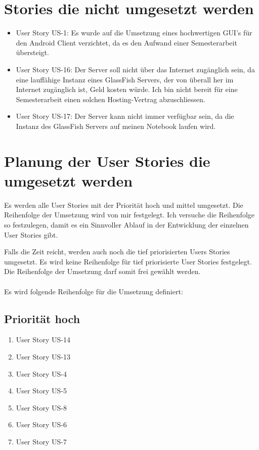 \documentclass[abstracton, listof=totocnumbered,
bibliography=totocnumbered]{scrreprt}
\begin{document}
  \clearpage
  
  \section{Stories die nicht umgesetzt werden}
  
  \begin{itemize}
    \item User Story US-1: Es wurde auf die Umsetzung eines hochwertigen
    \ac{GUI}'s für den Android Client verzichtet, da es den Aufwand einer
    Semesterarbeit übersteigt.
    \item User Story US-16: Der Server soll nicht über das Internet zugänglich
    sein, da eine lauffähige Instanz eines GlassFish Servers, der von überall
    her im Internet zugänglich ist, Geld kosten würde. Ich bin nicht bereit für
    eine Semesterarbeit einen solchen Hosting-Vertrag abzuschliessen.
    \item User Story US-17: Der Server kann nicht immer verfügbar sein, da die
    Instanz des GlassFish Servers auf meinen Notebook laufen wird.
  \end{itemize}
  
  \section{Planung der User Stories die umgesetzt werden}
  
  Es werden alle User Stories mit der Priorität hoch und mittel umgesetzt. Die
  Reihenfolge der Umsetzung wird von mir festgelegt. Ich versuche die
  Reihenfolge so festzulegen, damit es ein Sinnvoller Ablauf in der Entwicklung
  der einzelnen User Stories gibt.
  
  Falls die Zeit reicht, werden auch noch die tief priorisierten Users Stories
  umgesetzt. Es wird keine Reihenfolge für tief priorisierte User Stories
  festgelegt. Die Reihenfolge der Umsetzung darf somit frei gewählt werden.\\
  \\
  Es wird folgende Reihenfolge für die Umsetzung definiert:

  \subsection{Priorität hoch}
  
  
  \begin{enumerate}
    \item User Story US-14
    \item User Story US-13
    \item User Story US-4
    \item User Story US-5
    \item User Story US-8
    \item User Story US-6
    \item User Story US-7
    \setcounter{userStoriesZaehler}{\value{enumi}}
  \end{enumerate}
  
\end{document}
